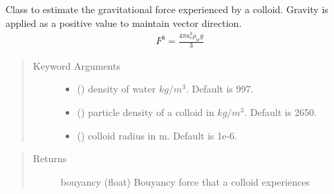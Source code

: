 \documentclass[letterpaper,10pt,english]{sphinxmanual}
\begin{document}
\begin{fulllineitems}
\label{\detokenize{index:lb_colloids.Colloids.Colloid_Math.Bouyancy}}
Class to estimate the gravitational force experienced by a colloid. Gravity
is applied as a positive value to maintain vector direction.
\begin{equation*}
\begin{split}F^{b} = \frac{4 \pi a_{c}^{3} \rho_{w} g}{3}\end{split}
\end{equation*}\begin{quote}\begin{description}
\item[{Keyword Arguments}] \leavevmode\begin{itemize}
\item {} 
 () \textendash{} density of water \(kg/m^3\). Default is 997.

\item {} 
 () \textendash{} particle density of a colloid in \(kg/m^3\). Default is 2650.

\item {} 
 () \textendash{} colloid radius in m. Default is 1e-6.

\end{itemize}

\end{description}\end{quote}
\begin{quote}\begin{description}
\item[{Returns}] \leavevmode
bouyancy (float) Bouyancy force that a colloid experiences

\end{description}\end{quote}

\end{fulllineitems}

\end{document}
